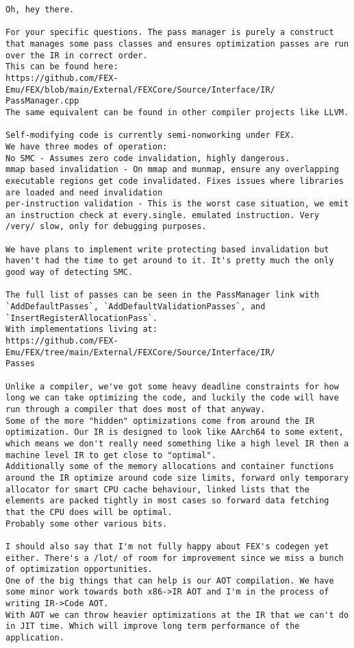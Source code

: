\begin{Verbatim}[fontsize=\footnotesize]
Oh, hey there.

For your specific questions. The pass manager is purely a construct
that manages some pass classes and ensures optimization passes are run
over the IR in correct order.
This can be found here:
https://github.com/FEX-Emu/FEX/blob/main/External/FEXCore/Source/Interface/IR/
PassManager.cpp
The same equivalent can be found in other compiler projects like LLVM.

Self-modifying code is currently semi-nonworking under FEX.
We have three modes of operation:
No SMC - Assumes zero code invalidation, highly dangerous.
mmap based invalidation - On mmap and munmap, ensure any overlapping
executable regions get code invalidated. Fixes issues where libraries
are loaded and need invalidation
per-instruction validation - This is the worst case situation, we emit
an instruction check at every.single. emulated instruction. Very
/very/ slow, only for debugging purposes.

We have plans to implement write protecting based invalidation but
haven't had the time to get around to it. It's pretty much the only
good way of detecting SMC.

The full list of passes can be seen in the PassManager link with
`AddDefaultPasses`, `AddDefaultValidationPasses`, and
`InsertRegisterAllocationPass`.
With implementations living at:
https://github.com/FEX-Emu/FEX/tree/main/External/FEXCore/Source/Interface/IR/
Passes

Unlike a compiler, we've got some heavy deadline constraints for how
long we can take optimizing the code, and luckily the code will have
run through a compiler that does most of that anyway.
Some of the more "hidden" optimizations come from around the IR
optimization. Our IR is designed to look like AArch64 to some extent,
which means we don't really need something like a high level IR then a
machine level IR to get close to "optimal".
Additionally some of the memory allocations and container functions
around the IR optimize around code size limits, forward only temporary
allocator for smart CPU cache behaviour, linked lists that the
elements are packed tightly in most cases so forward data fetching
that the CPU does will be optimal.
Probably some other various bits.

I should also say that I'm not fully happy about FEX's codegen yet
either. There's a /lot/ of room for improvement since we miss a bunch
of optimization opportunities.
One of the big things that can help is our AOT compilation. We have
some minor work towards both x86->IR AOT and I'm in the process of
writing IR->Code AOT.
With AOT we can throw heavier optimizations at the IR that we can't do
in JIT time. Which will improve long term performance of the
application.


\end{Verbatim}
